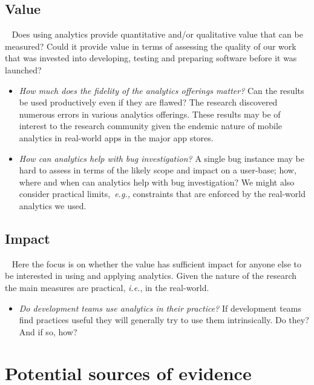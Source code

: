 \subsection{Value}~\label{section-value}
Does using analytics provide quantitative and/or qualitative value that can be measured? Could it provide value in terms of assessing the quality of our work that was invested into developing, testing and preparing software before it was launched?
\begin{itemize}
    \item \emph{How much does the fidelity of the analytics offerings matter?} Can the results be used productively even if they are flawed? The research discovered numerous errors in various analytics offerings. These results may be of interest to the research community given the endemic nature of mobile analytics in real-world apps in the major app stores.

    \item \emph{How can analytics help with bug investigation?} A single bug instance may be hard to assess in terms of the likely scope and impact on a user-base; how, where and when can analytics help with bug investigation? We might also consider practical limits,~\emph{e.g.,} constraints that are enforced by the real-world analytics we used. 
\end{itemize}

\subsection{Impact}~\label{section-impact}
Here the focus is on whether the value has sufficient impact for anyone else to be interested in using and applying analytics. Given the nature of the research the main measures are practical, \emph{i.e.}, in the real-world.
\begin{itemize}
    \item \emph{Do development teams use analytics in their practice?} If development teams find practices useful they will generally try to use them intrinsically. Do they? And if so, how?

\end{itemize}


\section{Potential sources of evidence}


